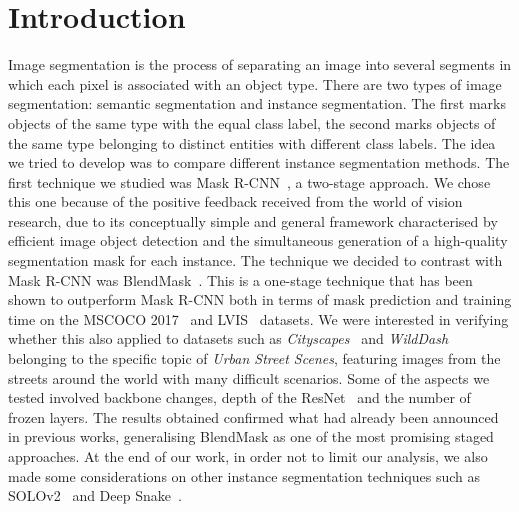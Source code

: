 \documentclass[10pt,twocolumn,letterpaper]{article}
\begin{document}
\section{Introduction}
Image segmentation is the process of separating an image into several segments in which each pixel is associated with an object type. There are two types of image segmentation: semantic segmentation and instance segmentation. The first marks objects of the same type with the equal class label, the second marks objects of the same type belonging to distinct entities with different class labels. The idea we tried to develop was to compare different instance segmentation methods. The first technique we studied was Mask R-CNN~\cite{Authors1_maskrcnn}, a two-stage approach. We chose this one because of the positive feedback received from the world of vision research, due to its conceptually simple and general framework characterised by efficient image object detection and the simultaneous generation of a high-quality segmentation mask for each instance. The technique we decided to contrast with Mask R-CNN was BlendMask~\cite{Authors2_BlendMask}. This is a one-stage technique that has been shown to outperform Mask R-CNN both in terms of mask prediction and training time on the MSCOCO 2017~\cite{Authors3_MSCOCO} and LVIS~\cite{Authors4_LVIS} datasets. We were interested in verifying whether this also applied to datasets such as \textit{Cityscapes}~\cite{cityscapes} and \textit{WildDash}~\cite{wildDash} belonging to the specific topic of \textit{Urban Street Scenes}, featuring images from the streets around the world with many difficult scenarios. Some of the aspects we tested involved backbone changes, depth of the ResNet~\cite{Authors5_ResNet} and the number of frozen layers. The results obtained confirmed what had already been announced in previous works, generalising BlendMask as one of the most promising staged approaches. At the end of our work, in order not to limit our analysis, we also made some considerations on other instance segmentation techniques such as SOLOv2~\cite{Authors6_SOLOv2} and Deep Snake~\cite{Authors7_deepsnake}.
\end{document}
